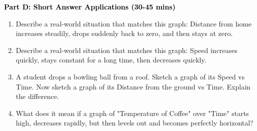 \documentclass[12pt, letterpaper, fleqn]{article}
\begin{document}
\newpage

\begin{tcolorbox}[colback=customteal!20]
\large\textcolor{black}{\textbf{Part D: Short Answer Applications (30-45 mins)}}
\end{tcolorbox}

\vspace{3mm}

\begin{enumerate}[itemsep=4.2cm, leftmargin=0.6cm, resume]
\item Describe a real-world situation that matches this graph: Distance from home increases steadily, drops suddenly back to zero, and then stays at zero.
\item Describe a real-world situation that matches this graph: Speed increases quickly, stays constant for a long time, then decreases quickly.
\item A student drops a bowling ball from a roof. Sketch a graph of its Speed vs Time. Now sketch a graph of its Distance from the ground vs Time. Explain the difference.
\item What does it mean if a graph of "Temperature of Coffee" over "Time" starts high, decreases rapidly, but then levels out and becomes perfectly horizontal?
\end{enumerate}
\end{document}
